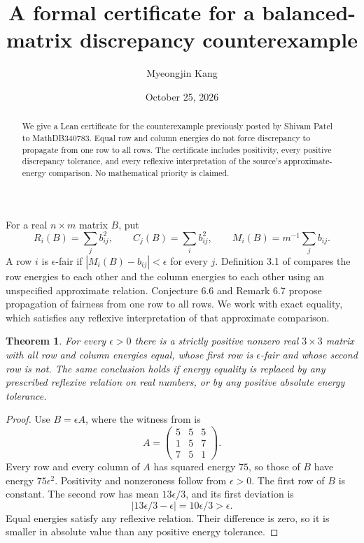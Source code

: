\documentclass[11pt]{article}
\title{A formal certificate for a balanced-matrix discrepancy counterexample}
\author{Myeongjin Kang}
\date{October 25, 2026}
\newtheorem{theorem}{Theorem}
\begin{document}
\maketitle
\begin{abstract}
We give a Lean certificate for the counterexample previously posted by Shivam
Patel to MathDB340783. Equal row and column energies do not force discrepancy
to propagate from one row to all rows. The certificate includes positivity,
every positive discrepancy tolerance, and every reflexive interpretation of
the source's approximate-energy comparison. No mathematical priority is claimed.
\end{abstract}
For a real $n\times m$ matrix $B$, put
\[
 R_i(B)=\sum_j b_{ij}^2,\qquad C_j(B)=\sum_i b_{ij}^2,
 \qquad M_i(B)=m^{-1}\sum_j b_{ij}.
\]
A row $i$ is $\epsilon$-fair if $|M_i(B)-b_{ij}|<\epsilon$ for every $j$.
Definition 3.1 of \cite{agama} compares the row energies to each other and
the column energies to each other using an unspecified approximate relation.
Conjecture 6.6 and Remark 6.7 propose propagation of fairness from one row
to all rows. We work with exact equality, which satisfies any reflexive
interpretation of that approximate comparison.
\begin{theorem}
For every $\epsilon>0$ there is a strictly positive nonzero real $3\times3$
matrix with all row and column energies equal, whose first row is
$\epsilon$-fair and whose second row is not. The same conclusion holds if
energy equality is replaced by any prescribed reflexive relation on real
numbers, or by any positive absolute energy tolerance.
\end{theorem}
\begin{proof}
Use $B=\epsilon A$, where the witness from \cite{patel} is
\[
A=\begin{pmatrix}5&5&5\\1&5&7\\7&5&1\end{pmatrix}.
\]
Every row and every column of $A$ has squared energy $75$, so those of
$B$ have energy $75\epsilon^2$. Positivity and nonzeroness follow from
$\epsilon>0$. The first row of $B$ is constant. The second row has mean
$13\epsilon/3$, and its first deviation is
\[
 |13\epsilon/3-\epsilon|=10\epsilon/3>\epsilon.
\]
Equal energies satisfy any reflexive relation. Their difference is zero,
so it is smaller in absolute value than any positive energy tolerance.
\end{proof}
\end{document}
